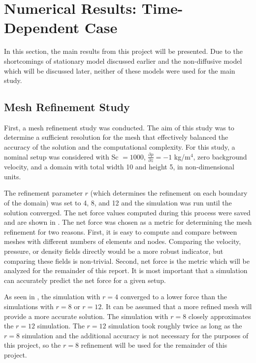 \documentclass[12pt]{article}
\begin{document}
\newpage

\section{Numerical Results: Time-Dependent Case}

In this section, the main results from this project will be presented. Due to the shortcomings of stationary model discussed earlier and the non-diffusive model which will be discussed later, neither of these models were used for the main study.

\subsection{Mesh Refinement Study}

First, a mesh refinement study was conducted. The aim of this study was to determine a sufficient resolution for the mesh that effectively balanced the accuracy of the solution and the computational complexity. For this study, a nominal setup was considered with Sc $=1000$, $\frac{\partial \rho}{\partial z}=-1$ kg/m$^4$, zero background velocity, and a domain with total width 10 and height 5, in non-dimensional units.

The refinement parameter $r$ (which determines the refinement on each boundary of the domain) was set to 4, 8, and 12 and the simulation was run until the solution converged. The net force values computed during this process were saved and are shown in . The net force was chosen as a metric for determining the mesh refinement for two reasons. First, it is easy to compute and compare between meshes with different numbers of elements and nodes. Comparing the velocity, pressure, or density fields directly would be a more robust indicator, but comparing these fields is non-trivial. Second, net force is the metric which will be analyzed for the remainder of this report. It is most important that a simulation can accurately predict the net force for a given setup.


As seen in , the simulation with $r=4$ converged to a lower force than the simulations with $r=8$ or $r=12$. It can be assumed that a more refined mesh will provide a more accurate solution. The simulation with $r=8$ closely approximates the $r=12$ simulation. The $r=12$ simulation took roughly twice as long as the $r=8$ simulation and the additional accuracy is not necessary for the purposes of this project, so the $r=8$ refinement will be used for the remainder of this project.
\end{document}
